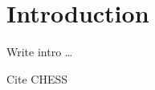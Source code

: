 \section{Introduction}
\label{sec:introduction}

Write intro \dots

Cite CHESS~\cite{ishaq2019clustered}
